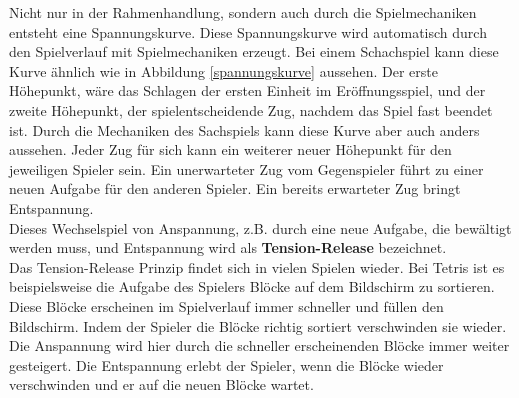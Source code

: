 Nicht nur in der Rahmenhandlung, sondern auch durch die Spielmechaniken entsteht eine Spannungskurve. Diese Spannungskurve wird automatisch durch den Spielverlauf mit Spielmechaniken erzeugt. Bei einem Schachspiel kann diese Kurve ähnlich wie in Abbildung \ref{spannungskurve} aussehen. %
Der erste Höhepunkt, wäre das Schlagen der ersten Einheit im Eröffnungsspiel, und der zweite Höhepunkt, der spielentscheidende Zug, nachdem das Spiel fast beendet ist. Durch die Mechaniken des Sachspiels kann diese Kurve aber auch anders aussehen. Jeder Zug für sich kann ein weiterer neuer Höhepunkt für den jeweiligen Spieler sein. Ein unerwarteter Zug vom Gegenspieler führt zu einer neuen Aufgabe für den anderen Spieler. Ein bereits erwarteter Zug bringt Entspannung. \cite[S. 9]{Adams:1515529}\\
Dieses Wechselspiel von Anspannung, z.B. durch eine neue Aufgabe, die bewältigt werden muss, und Entspannung wird als \textbf{Tension-Release} bezeichnet. \cite[S. 4]{Adams:1515529}\\ 
Das Tension-Release Prinzip findet sich in vielen Spielen wieder. Bei Tetris ist es beispielsweise die Aufgabe des Spielers Blöcke auf dem Bildschirm zu sortieren. Diese Blöcke erscheinen im Spielverlauf immer schneller und füllen den Bildschirm. Indem der Spieler die Blöcke richtig sortiert verschwinden sie wieder. Die Anspannung wird hier durch die schneller erscheinenden Blöcke immer weiter gesteigert. Die Entspannung erlebt der Spieler, wenn die Blöcke wieder verschwinden und er auf die neuen Blöcke wartet.





